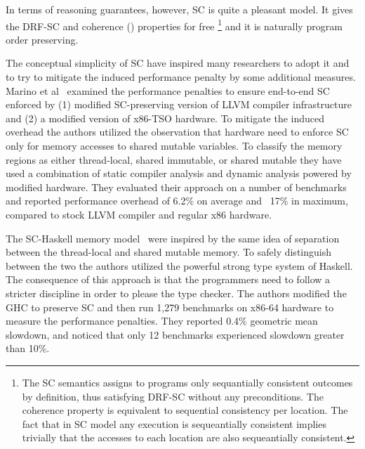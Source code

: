 In terms of reasoning guarantees, however, SC is quite a pleasant model. 
It gives the DRF-SC and coherence () 
properties for free%
\footnote{The SC semantics assigns to programs only sequantially consistent
outcomes by definition, thus satisfying DRF-SC without any preconditions.
The coherence property is equivalent to sequential consistency per location.
The fact that in SC model any execution is sequeantially consistent implies trivially
that the accesses to each location are also sequeantially consistent.}
and it is naturally program order preserving.

The conceptual simplicity of SC have inspired many researchers 
to adopt it and to try to mitigate the induced performance 
penalty by some additional measures.
Marino et al~\cite{Marino-al:PLDI11, Singh-al:ISCA12} 
examined the performance penalties to ensure end-to-end SC
enforced by (1) modified SC-preserving version 
of LLVM compiler infrastructure and 
(2) a modified version of x86-TSO hardware. 
To mitigate the induced overhead the authors 
utilized the observation that hardware need to 
enforce SC only for memory accesses to shared mutable variables. 
To classify the memory regions as either thread-local,
shared immutable, or shared mutable they have used 
a combination of static compiler analysis and 
dynamic analysis powered by modified hardware. 
They evaluated their approach on a number of benchmarks
and reported performance overhead of 6.2\% on average 
and ~17\% in maximum, compared to stock LLVM compiler 
and regular x86 hardware. 

The SC-Haskell memory model~\cite{Vollmer-al:PPoPP17}
were inspired by the same idea of separation
between the thread-local and shared mutable memory. 
To safely distinguish between the two 
the authors utilized the powerful strong type system of Haskell. 
The consequence of this approach is that the 
programmers need to follow a stricter discipline 
in order to please the type checker. 
The authors modified the GHC to preserve SC 
and then run 1,279 benchmarks on x86-64 hardware
to measure the performance penalties.
They reported 0.4\% geometric mean slowdown,
and noticed that only 12 benchmarks experienced 
slowdown greater than 10\%.

